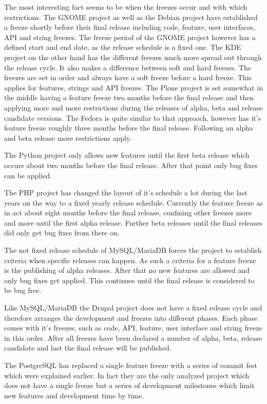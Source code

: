 The most interesting fact seems to be when the freezes occur and with which
restrictions. The GNOME project as well as the Debian project have established
a freeze shortly before their final release including code, feature, user
interfaces, \ac{API} and string freezes. The freeze period of the GNOME project
however has a defined start and end date, as the release schedule is a fixed
one. The KDE project on the other hand has the different freezes much more
spread out through the release cycle. It also makes a difference between soft
and hard freezes. The freezes are set in order and always have a soft freeze
before a hard freeze. This applies for features, strings and \ac{API} freezes.
The Plone project is set somewhat in the middle having a feature freeze two
months before the final release and then applying more and more restrictions
during the releases of alpha, beta and release candidate versions. The Fedora
is quite similar to that approach, however has it's feature freeze roughly
three months before the final release. Following an alpha and beta release more
restrictions apply.

The Python project only allows new features until the first beta release which
occurs about two months before the final release. After that point only bug
fixes can be applied.

The PHP project has changed the layout of it's schedule a lot during the last
years on the way to a fixed yearly release schedule. Currently the feature
freeze as in act about eight months before the final release, confining other
freezes more and more until the first alpha release. Further beta releases
until the final releases did only get bug fixes from there on.

The not fixed release schedule of MySQL/MariaDB forces the project to establish
criteria when specific releases can happen. As such a criteria for a feature
freeze is the publishing of alpha releases. After that no new features are
allowed and only bug fixes get applied. This continues until the final release
is considered to be bug free.

Like MySQL/MariaDB the Drupal project does not have a fixed release cycle and
therefore arranges the development and freezes into different phases. Each
phase comes with it's freezes, such as code, \ac{API}, feature, user interface
and string freeze in this order. After all freezes have been declared a number
of alpha, beta, release candidate and last the final release will be published.

The PostgreSQL has replaced a single feature freeze with a series of commit
fest which were explained earlier. In fact they are the only analyzed project
which does not have a single freeze but a series of development milestones
which limit new features and development time by time.

